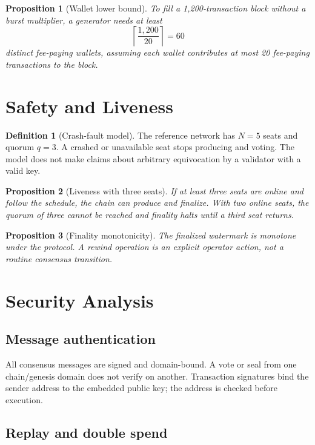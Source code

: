 \documentclass[11pt,a4paper]{article}
\theoremstyle{definition}
\newtheorem{definition}{Definition}[section]
\theoremstyle{plain}
\newtheorem{proposition}{Proposition}[section]
\begin{document}
\begin{proposition}[Wallet lower bound]
To fill a 1,200-transaction block without a burst multiplier, a generator
needs at least
\[
  \left\lceil \frac{1{,}200}{20}\right\rceil=60
\]
distinct fee-paying wallets, assuming each wallet contributes at most 20
fee-paying transactions to the block.
\end{proposition}

\section{Safety and Liveness}

\begin{definition}[Crash-fault model]
The reference network has $N=5$ seats and quorum $q=3$. A crashed or
unavailable seat stops producing and voting. The model does not make claims
about arbitrary equivocation by a validator with a valid key.
\end{definition}

\begin{proposition}[Liveness with three seats]
If at least three seats are online and follow the schedule, the chain can
produce and finalize. With two online seats, the quorum of three cannot be
reached and finality halts until a third seat returns.
\end{proposition}

\begin{proposition}[Finality monotonicity]
The finalized watermark is monotone under the protocol. A rewind operation is
an explicit operator action, not a routine consensus transition.
\end{proposition}

\section{Security Analysis}

\subsection{Message authentication}

All consensus messages are signed and domain-bound. A vote or seal from one
chain/genesis domain does not verify on another. Transaction signatures bind
the sender address to the embedded public key; the address is checked before
execution.

\subsection{Replay and double spend}
\end{document}
